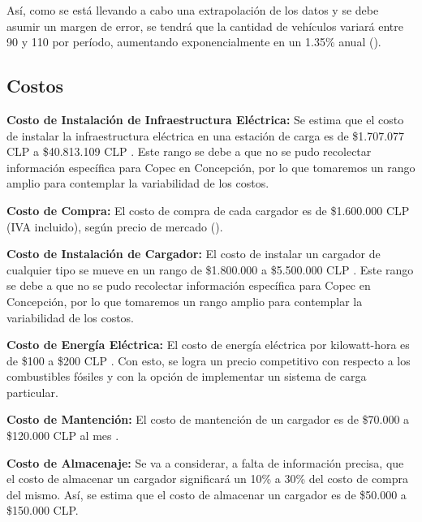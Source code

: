 \documentclass[letterpaper]{article}
\begin{document}
\begin{flushleft}
	Así, como se está llevando a cabo una extrapolación de los datos y se debe asumir un margen de error, se tendrá que la cantidad de vehículos variará entre 90 y 110 por período, aumentando exponencialmente en un 1.35\% anual (\cite{incremento-autos}).

	\subsection{Costos}

	\textbf{Costo de Instalación de Infraestructura Eléctrica:} Se estima que el costo de instalar la infraestructura eléctrica en una estación de carga es de \$1.707.077 CLP a \$40.813.109 CLP \cite{infraestructura}. Este rango se debe a que no se pudo recolectar información específica para Copec en Concepción, por lo que tomaremos un rango amplio para contemplar la variabilidad de los costos.

	\textbf{Costo de Compra:} El costo de compra de cada cargador es de \$1.600.000 CLP (IVA incluido), según precio de mercado (\cite{charge-cost}).

	\textbf{Costo de Instalación de Cargador:} El costo de instalar un cargador de cualquier tipo se mueve en un rango de \$1.800.000 a \$5.500.000 CLP \cite{infraestructura}. Este rango se debe a que no se pudo recolectar información específica para Copec en Concepción, por lo que tomaremos un rango amplio para contemplar la variabilidad de los costos.

	\textbf{Costo de Energía Eléctrica:} El costo de energía eléctrica por kilowatt-hora es de \$100 a \$200 CLP \cite{kwh}. Con esto, se logra un precio competitivo con respecto a los combustibles fósiles y con la opción de implementar un sistema de carga particular.

	\textbf{Costo de Mantención:} El costo de mantención de un cargador es de \$70.000 a \$120.000 CLP al mes \cite{mantencion}.

	\textbf{Costo de Almacenaje:} Se va a considerar, a falta de información precisa, que el costo de almacenar un cargador significará un 10\% a 30\% del costo de compra del mismo. Así, se estima que el costo de almacenar un cargador es de \$50.000 a \$150.000 CLP.

\end{flushleft}
\end{document}
